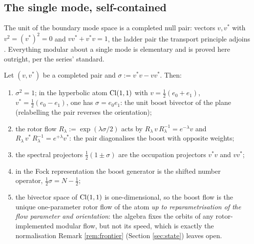\subsection{The single mode, self-contained}\label{subsec:mode}

The unit of the boundary mode space is a completed null pair: vectors $v, v^*$ with $v^2 = (v^*)^2 = 0$ and $vv^* + v^*v = 1$, the ladder pair the transport principle adjoins \cite{ButlerT1}. Everything modular about a single mode is elementary and is proved here outright, per the series' standard.

\begin{proposition}\label{prop:mode}
Let $(v, v^*)$ be a completed pair and $\sigma := v^*v - vv^*$. Then:
\begin{enumerate}
\item $\sigma^2 = 1$; in the hyperbolic atom $\mathrm{Cl}(1,1)$ with $v = \tfrac12(e_0 + e_1)$, $v^* = \tfrac12(e_0 - e_1)$, one has $\sigma = e_0 e_1$: the unit boost bivector of the plane (relabelling the pair reverses the orientation);
\item the rotor flow $R_\lambda := \exp(\lambda\sigma/2)$ acts by $R_\lambda\, v\, R_\lambda^{-1} = e^{-\lambda}v$ and $R_\lambda\, v^*\, R_\lambda^{-1} = e^{+\lambda}v^*$: the pair diagonalises the boost with opposite weights;
\item the spectral projectors $\tfrac12(1 \pm \sigma)$ are the occupation projectors $v^*v$ and $vv^*$;
\item in the Fock representation the boost generator is the shifted number operator, $\tfrac12\sigma = N - \tfrac12$;
\item the bivector space of $\mathrm{Cl}(1,1)$ is one-dimensional, so the boost flow is the unique one-parameter rotor flow of the atom \emph{up to reparametrisation of the flow parameter and orientation}: the algebra fixes the orbits of any rotor-implemented modular flow, but not its speed, which is exactly the normalisation Remark \ref{rem:frontier} (Section \ref{sec:state}) leaves open.
\end{enumerate}
\end{proposition}

